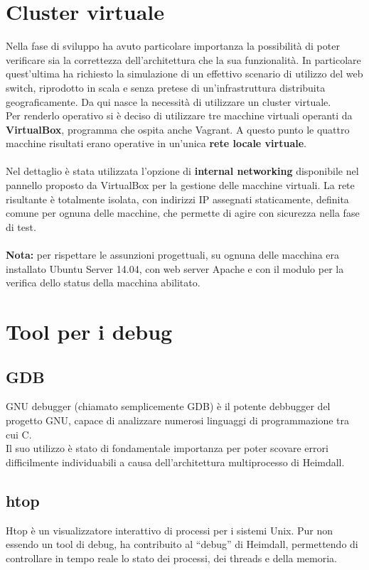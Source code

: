 \documentclass[italian]{tktltiki2}
\begin{document}
\newpage
\section{Cluster virtuale}
Nella fase di sviluppo ha avuto particolare importanza la possibilità di poter verificare sia la correttezza dell'architettura che la sua funzionalità. In particolare quest'ultima ha richiesto la simulazione di un effettivo scenario di utilizzo del web switch, riprodotto in scala e senza pretese di un'infrastruttura distribuita geograficamente. Da qui nasce la necessità di utilizzare un cluster virtuale.\\
Per renderlo operativo si è deciso di utilizzare tre macchine virtuali operanti da \textbf{VirtualBox}\cite{virtualbox}, programma che ospita anche Vagrant. A questo punto le quattro macchine risultati erano operative in un'unica \textbf{rete locale virtuale}. \\\\
Nel dettaglio è stata utilizzata l'opzione di \textbf{internal networking} disponibile nel pannello proposto da VirtualBox per la gestione delle macchine virtuali. La rete risultante è totalmente isolata, con indirizzi IP assegnati staticamente, definita comune per ognuna delle macchine, che permette di agire con sicurezza nella fase di test. \\\\
\textbf{Nota: } per rispettare le assunzioni progettuali, su ognuna delle macchina era installato Ubuntu Server 14.04, con web server Apache e con il modulo per la verifica dello status della macchina abilitato.

\newpage
\section{Tool per i debug}
\subsection{GDB}
GNU debugger (chiamato semplicemente GDB)\cite{gdb} è il potente debbugger del progetto GNU, capace di analizzare numerosi linguaggi di programmazione tra cui C.
\\
Il suo utilizzo è stato di fondamentale importanza per poter scovare errori difficilmente individuabili a causa dell'architettura multiprocesso di Heimdall.

\subsection{htop}
Htop\cite{htop} è un visualizzatore interattivo di processi per i sistemi Unix. Pur non essendo un tool di debug, ha contribuito al ``debug'' di Heimdall, permettendo di controllare in tempo reale lo stato dei processi, dei threads e della memoria.
\end{document}
